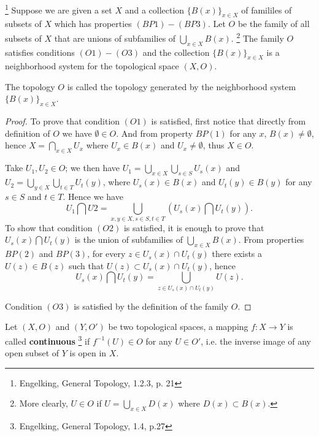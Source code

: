 \begin{proposition} 
\label{P:top_gen}
\footnote{Engelking, General Topology, 1.2.3, p. 21}
Suppose we are given a set $X$ and a collection $\{B(x)\}_{x\in X}$ of famililes
of subsets of $X$ which has properties $(BP1)-(BP3)$. Let $O$ be the family of
all subsets of $X$ that are unions of subfamilies of $\bigcup_{x\in X}B(x)$. 
  \footnote{More clearly, $U\in O$ if $U=\bigcup_{x\in X} D(x)$ where 
    $D(x)\subset B(x)$.}
The family $O$ satisfies conditions $(O1)-(O3)$ and the collection 
$\{B(x)\}_{x\in X}$ is a neighborhood system for the topological space $(X,O)$.

The topology $O$ is called the topology generated by the neighborhood system 
$\{B(x)\}_{x\in X}$.
\end{proposition}
\begin{proof}
To prove that condition $(O1)$ is satisfied, first notice that directly from 
definition of $O$ we have $\emptyset \in O$. And from property
$BP(1)$ for any $x$, $B(x)\neq \emptyset$, hence $X=\bigcap_{x\in X} U_x$ where
$U_x\in B(x)$ and $U_x\neq \emptyset$, thus $X\in O$.

Take $U_1,U_2\in O$; we then have 
$U_1=\bigcup_{x\in X} \bigcup_{s\in S} U_s(x)$ and
$U_2=\bigcup_{y\in X} \bigcup_{t\in T} U_t(y)$, where $U_s(x)\in B(x)$ and 
$U_t(y)\in B(y)$ for any $s\in S$ and $t\in T$. Hence we have
\[
  U_1\bigcap U2 = \bigcup_{x,y\in X, s\in S, t\in T} 
                  \left( U_s(x)\bigcap U_t(y) \right).
\]
To show that condition $(O2)$ is satisfied, it is enough to prove that 
$U_s(x)\bigcap U_t(y)$ is the union of subfamilies of $\bigcup_{x\in X}B(x)$. 
From properties $BP(2)$ and $BP(3)$, for every $z\in U_s(x)\cap U_t(y)$ there
exists a $U(z)\in B(z)$ such that $U(z)\subset U_s(x)\cap U_t(y)$, hence
\[
  U_s(x)\bigcap U_t(y)=\bigcup_{z\in U_s(x)\cap U_t(y)} U(z).
\]

Condition $(O3)$ is satisfied by the definition of the family $O$.
\end{proof}


\begin{definition} \label{D:cont}
Let $(X,O)$ and $(Y,O')$ be two topological spaces, a mapping $f:X\to Y$ is
called \textbf{continuous} 
\footnote{Engelking, General Topology, 1.4, p.27}
if $f^{-1}(U)\in O$ for any $U\in O'$, i.e. the
inverse image of any open subset of $Y$ is open in $X$.
\end{definition}


